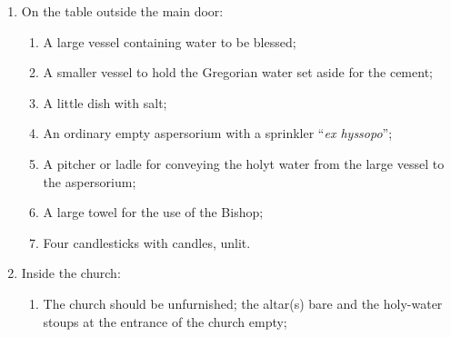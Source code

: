 \documentclass[letterpaper]{report}
\begin{document}
{\begin{enumerate}[label=\Roman*.]
\begin{enumerate}[label=\arabic*.]
                \item A tabled covered in white, to the right side of the door

            \end{enumerate}

        \item On the table outside the main door:

            \begin{enumerate}[label=\arabic*.]
                
                \item A large vessel containing water to be blessed;

                \item A smaller vessel to hold the Gregorian water set aside
                    for the cement;

                \item A little dish with salt;

                \item An ordinary empty aspersorium with a sprinkler
                    ``\textit{ex hyssopo}'';

                \item A pitcher or ladle for conveying the holyt water from the
                    large vessel to the aspersorium;

                \item A large towel for the use of the Bishop;

                \item Four candlesticks with candles, unlit.

            \end{enumerate}

        \item Inside the church:

            \begin{enumerate}[label=\arabic*.]

                \item The church should be unfurnished; the altar(s) bare and
                    the holy-water stoups at the entrance of the  church empty;


\end{enumerate}
\end{enumerate}}
\end{document}
